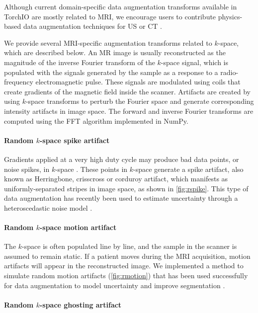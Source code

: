 Although current domain-specific data augmentation transforms available in TorchIO are mostly related to \ac{MRI}, we encourage users to contribute physics-based data augmentation techniques for \ac{US} or \ac{CT} \cite{omigbodun_effects_2019}.

We provide several \ac{MRI}-specific augmentation transforms related to $k$-space, which are described below.
An MR image is usually reconstructed as the magnitude of the inverse Fourier transform of the $k$-space signal, which is populated with the signals generated by the sample as a response to a radio-frequency electromagnetic pulse.
These signals are modulated using coils that create gradients of the magnetic field inside the scanner.
Artifacts are created by using $k$-space transforms to perturb the Fourier space and generate corresponding intensity artifacts in image space.
The forward and inverse Fourier transforms are computed using the \ac{FFT} algorithm implemented in NumPy.


\paragraph{Random $k$-space spike artifact}

Gradients applied at a very high duty cycle may produce bad data points, or noise spikes, in $k$-space \cite{zhuo_mr_2006}.
These points in $k$-space generate a spike artifact, also known as Herringbone, crisscross or corduroy artifact, which manifests as uniformly-separated stripes in image space, as shown in \cref{fig:rspike}.
This type of data augmentation has recently been used to estimate uncertainty through a heteroscedastic noise model \cite{shaw_heteroscedastic_2020}.


\paragraph{Random $k$-space motion artifact}

The $k$-space is often populated line by line, and the sample in the scanner is assumed to remain static.
If a patient moves during the \ac{MRI} acquisition, motion artifacts will appear in the reconstructed image.
We implemented a method to simulate random motion artifacts (\cref{fig:rmotion}) that has been used successfully for data augmentation to model uncertainty and improve segmentation \cite{shaw_mri_2019}.


\paragraph{Random $k$-space ghosting artifact}

